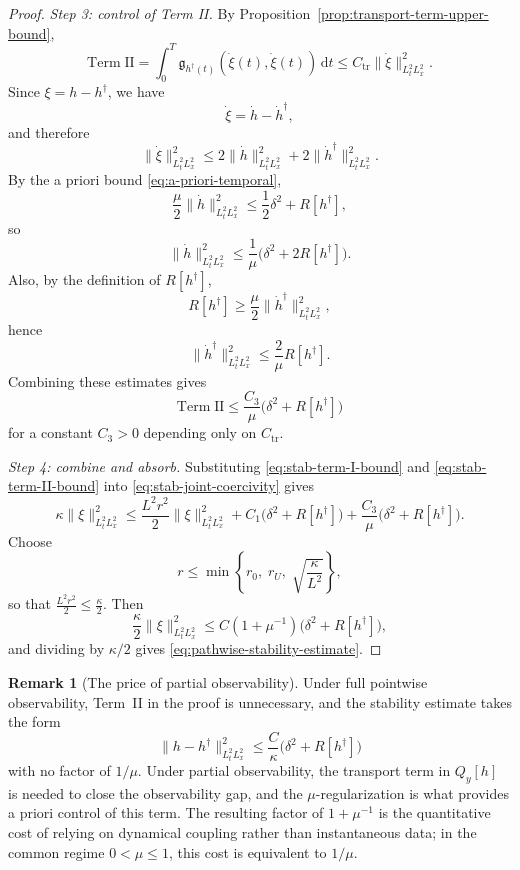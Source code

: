 \documentclass{article}
\theoremstyle{definition}
\newtheorem{remark}[theorem]{Remark}
\renewcommand{\d}{\mathrm{d}}
\begin{document}
\begin{proof}
    \medskip
    \noindent
    \emph{Step 3: control of Term II.}
    By Proposition~\ref{prop:transport-term-upper-bound},
    \[
        \mathrm{Term\;II}
        =
        \int_0^T \mathfrak g_{h^\dagger(t)}(\dot\xi(t),\dot\xi(t))\,\d t
        \le
        C_{\mathrm{tr}}\|\dot\xi\|_{L^2_tL^2_x}^2.
    \]
    Since \(\xi=h-h^\dagger\), we have
    \[
        \dot\xi=\dot h-\dot h^\dagger,
    \]
    and therefore
    \[
        \|\dot\xi\|_{L^2_tL^2_x}^2
        \le
        2\|\dot h\|_{L^2_tL^2_x}^2
        +
        2\|\dot h^\dagger\|_{L^2_tL^2_x}^2.
    \]
    By the a priori bound \eqref{eq:a-priori-temporal},
    \[
        \frac{\mu}{2}\|\dot h\|_{L^2_tL^2_x}^2
        \le
        \frac12\delta^2+R[h^\dagger],
    \]
    so
    \[
        \|\dot h\|_{L^2_tL^2_x}^2
        \le
        \frac{1}{\mu}\bigl(\delta^2+2R[h^\dagger]\bigr).
    \]
    Also, by the definition of \(R[h^\dagger]\),
    \[
        R[h^\dagger]
        \ge
        \frac{\mu}{2}\|\dot h^\dagger\|_{L^2_tL^2_x}^2,
    \]
    hence
    \[
        \|\dot h^\dagger\|_{L^2_tL^2_x}^2
        \le
        \frac{2}{\mu}R[h^\dagger].
    \]
    Combining these estimates gives
    \begin{equation}
        \label{eq:stab-term-II-bound}
        \mathrm{Term\;II}
        \le
        \frac{C_3}{\mu}\bigl(\delta^2+R[h^\dagger]\bigr)
    \end{equation}
    for a constant \(C_3>0\) depending only on \(C_{\mathrm{tr}}\).

    \medskip
    \noindent
    \emph{Step 4: combine and absorb.}
    Substituting \eqref{eq:stab-term-I-bound} and \eqref{eq:stab-term-II-bound} into
    \eqref{eq:stab-joint-coercivity} gives
    \[
        \kappa\|\xi\|_{L^2_tL^2_x}^2
        \le
        \frac{L^2 r^2}{2}\|\xi\|_{L^2_tL^2_x}^2
        +
        C_1\bigl(\delta^2+R[h^\dagger]\bigr)
        +
        \frac{C_3}{\mu}\bigl(\delta^2+R[h^\dagger]\bigr).
    \]
    Choose
    \[
        r
        \le
        \min\left\{r_0,\;r_U,\;\sqrt{\frac{\kappa}{L^2}}\right\},
    \]
    so that \(\frac{L^2 r^2}{2}\le \frac\kappa2\). Then
    \[
        \frac\kappa2\|\xi\|_{L^2_tL^2_x}^2
        \le
        C(1+\mu^{-1})\bigl(\delta^2+R[h^\dagger]\bigr),
    \]
    and dividing by \(\kappa/2\) gives \eqref{eq:pathwise-stability-estimate}.
\end{proof}

\begin{remark}[The price of partial observability]
    \label{rem:price-of-partial-observability}
    Under full pointwise observability, Term~II in the proof is unnecessary, and the stability
    estimate takes the form
    \[
        \|h-h^\dagger\|_{L^2_tL^2_x}^2
        \le
        \frac{C}{\kappa}\bigl(\delta^2+R[h^\dagger]\bigr)
    \]
    with no factor of \(1/\mu\). Under partial observability, the transport term in \(Q_y[h]\) is
    needed to close the observability gap, and the \(\mu\)-regularization is what provides a priori
    control of this term. The resulting factor of \(1+\mu^{-1}\) is the quantitative cost of
    relying on dynamical coupling rather than instantaneous data; in the common regime
    \(0<\mu\le1\), this cost is equivalent to \(1/\mu\).
\end{remark}
\end{document}
